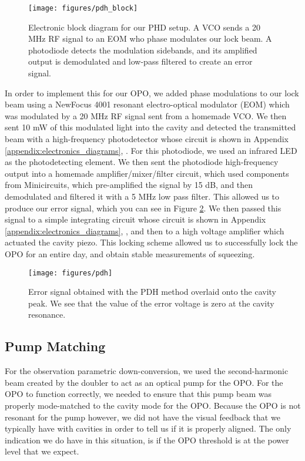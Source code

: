 \begin{figure}[!ht] 
 \centering 
 \texttt{[image: figures/pdh\_block]} 
 \caption[Pound-Drever-Hall block diagram]{Electronic block diagram for our PHD setup. A VCO sends a 20 MHz RF signal to an EOM who phase modulates our lock beam.  A photodiode detects the modulation sidebands, and its amplified output is demodulated and low-pass filtered to create an error signal.} 
 \label{fig:pdh_block} 
\end{figure}

In order to implement this for our OPO, we added phase modulations to our lock
beam using a NewFocus 4001 resonant electro-optical modulator (EOM) which was
modulated by a 20 MHz RF signal sent from a homemade VCO.  We then sent 10 mW of
this modulated light into the cavity and detected the transmitted beam with a
high-frequency photodetector whose circuit is shown in Appendix
\ref{appendix:electronics_diagrams}, .  For this
photodiode, we used an infrared LED as the photodetecting element.  We then sent
the photodiode high-frequency output into a homemade amplifier/mixer/filter
circuit, which used components from Minicircuits, which pre-amplified the signal
by 15 dB, and then demodulated and filtered it with a 5 MHz low pass filter.
This allowed us to produce our error signal, which you can see in Figure
\ref{fig:pdh_error}.  We then passed this signal to a simple integrating circuit
whose circuit is shown in Appendix \ref{appendix:electronics_diagrams},
, and then to a high voltage amplifier which actuated
the cavity piezo.  This locking scheme allowed us to successfully lock the OPO
for an entire day, and obtain stable measurements of squeezing.


\begin{figure}[ht] 
 \centering 
 \texttt{[image: figures/pdh]} 
 \caption[Experimental Pound-Drever-Hall error signal]{Error signal obtained with the PDH method overlaid onto the cavity peak.  We see that the value of the error voltage is zero at the cavity resonance.} 
 \label{fig:pdh_error} 
\end{figure} 


\subsection{Pump Matching} 
\label{pump_matching} 

For the observation parametric down-conversion, we used the second-harmonic beam created by the doubler to act as an optical pump for the OPO.  For the OPO to function correctly, we needed to ensure that this pump beam was properly mode-matched to the cavity mode for the OPO.  Because the OPO is not resonant for the pump however, we did not have the visual feedback that we typically have with cavities in order to tell us if it is properly aligned.  The only indication we do have in this situation, is if the OPO threshold is at the power level that we expect.  

